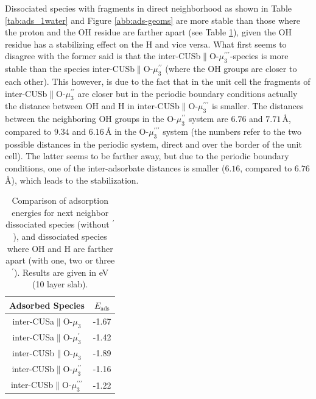 \documentclass[11pt,DIV=13,BCOR=5mm,a4paper,headinclude]{scrbook}
\begin{document}
Dissociated species with fragments in direct neighborhood as shown in Table \ref{tab:ads_1water} and Figure \ref{abb:ads-geoms} are more stable than those where the proton and the OH residue are farther apart (see Table \ref{tab:ads_1waterfurther}), given the OH residue has a stabilizing effect on the H and vice versa.
What first seems to disagree with the former said is that the inter-CUSb$\parallel$O-$\mu_3^{\prime\prime\prime}$-species is more stable than the species inter-CUSb$\parallel$O-$\mu_3^{\prime\prime}$ (where the OH groups are closer to each other).
This however, is due to the fact that in the unit cell the fragments of inter-CUSb$\parallel$O-$\mu_3^{\prime\prime}$ are closer but in the periodic boundary conditions actually the distance between OH and H in inter-CUSb$\parallel$O-$\mu_3^{\prime\prime\prime}$ is smaller.
The distances between the neighboring OH groups in the O-$\mu_3^{\prime\prime}$ system are $6.76$ and $7.71\,$\AA{}, compared to $9.34$ and $6.16\,$\AA{} in the O-$\mu_3^{\prime\prime\prime}$ system (the numbers refer to the two possible distances in the periodic system, direct and over the border of the unit cell).
The latter seems to be farther away, but due to the periodic boundary conditions, one of the inter-adsorbate distances is smaller ($6.16$, compared to $6.76\,$\AA{}), which leads to the stabilization.

\begin{table}[!ht]
  \centering
 \caption{Comparison of adsorption energies for next neighbor dissociated species (without $^\prime$), and dissociated species where OH and H are farther apart (with one, two or three $^\prime$). 
Results are given in eV (10 layer slab).
\vspace*{.2cm} 
  }
  \begin{tabular}{cc}
  \toprule
  Adsorbed Species  & $E_\textrm{ads}$  \\\midrule
   inter-CUSa$\parallel$O-$\mu_3$ & -1.67 \\
   inter-CUSa$\parallel$O-$\mu_3^\prime$ & -1.42 \\\hline
   inter-CUSb$\parallel$O-$\mu_3$ & -1.89\\
   inter-CUSb$\parallel$O-$\mu_3^{\prime\prime}$ & -1.16\\
   inter-CUSb$\parallel$O-$\mu_3^{\prime\prime\prime}$ & -1.22\\\bottomrule
  \end{tabular}
  \label{tab:ads_1waterfurther}
\end{table}
\end{document}
